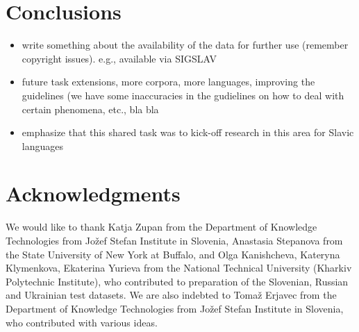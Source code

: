 \documentclass[11pt]{article}
\begin{document}

\section{Conclusions}
\label{sec:conclusions}


\begin{itemize}

\item write something about the availability of the data for further use (remember copyright issues). e.g.,
available via SIGSLAV 

\item future task extensions, more corpora, more languages, improving the guidelines (we have some inaccuracies
in the gudielines on how to deal with certain phenomena, etc., bla bla

\item emphasize that this shared task was to kick-off research in this area for Slavic languages

\end{itemize}


\section*{Acknowledgments}


We would like to thank Katja Zupan from the Department of Knowledge Technologies from
Jožef Stefan Institute in Slovenia, Anastasia Stepanova from the State University of New York at Buffalo, 
and Olga Kanishcheva, Kateryna Klymenkova, Ekaterina Yurieva from the National Technical University 
(Kharkiv Polytechnic Institute), who contributed to preparation of the Slovenian, Russian and Ukrainian test 
datasets. We are also indebted to Tomaž Erjavec from the Department of Knowledge Technologies from Jožef Stefan 
Institute in Slovenia, who contributed with various ideas.






\end{document}
